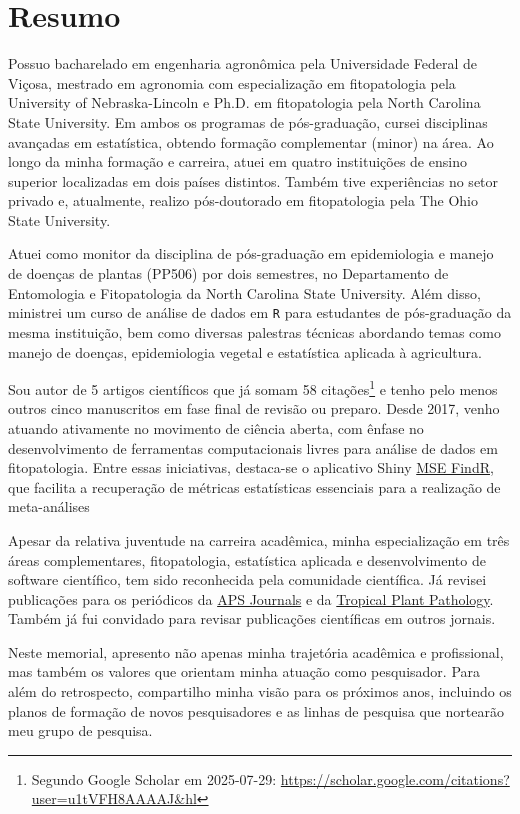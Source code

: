 \documentclass[12pt,a4paper,oneside]{book}
\newcommand{\UFV}{Universidade Federal de Viçosa}
\newcommand{\UNL}{University of Nebraska-Lincoln}
\newcommand{\NCState}{North Carolina State University}
\newcommand{\OSU}{The Ohio State University}
\newcommand{\APSJournals}{\href{https://apsjournals.apsnet.org/}{APS Journals}}
\newcommand{\TropicalPP}{\href{https://link.springer.com/journal/40858}{Tropical Plant Pathology}}
\newcommand{\MSEFindR}{\href{https://garnica.shinyapps.io/MSE_FindR/}{MSE FindR}}
\begin{document}
\chapter*{Resumo}

Possuo bacharelado em engenharia agronômica pela \UFV{}, mestrado em agronomia com especialização em 
fitopatologia pela \UNL{} e Ph.D. em fitopatologia pela \NCState{}. Em ambos os programas de pós-graduação, 
cursei disciplinas avançadas em estatística, obtendo formação complementar (minor) na área. Ao longo da
minha formação e carreira, atuei em quatro instituições de ensino superior localizadas em dois países 
distintos. Também tive experiências no setor privado e, atualmente, realizo pós-doutorado em fitopatologia 
pela \OSU{}.

Atuei como monitor da disciplina de pós-graduação em epidemiologia e manejo de doenças de plantas (PP506) por 
dois semestres, no Departamento de Entomologia e Fitopatologia da \NCState{}. Além disso, ministrei 
um curso de análise de dados em \texttt{R} para estudantes de pós-graduação da mesma instituição, bem 
como diversas palestras técnicas abordando temas como manejo de doenças, epidemiologia vegetal e 
estatística aplicada à agricultura.

Sou autor de 5 artigos científicos que já somam 58 citações\footnote{Segundo Google Scholar em 2025-07-29: \url{https://scholar.google.com/citations?user=u1tVFH8AAAAJ&hl}} e
tenho pelo menos outros cinco manuscritos em fase final de revisão ou preparo. Desde 2017, venho 
atuando ativamente no movimento de ciência aberta, com ênfase no desenvolvimento de ferramentas 
computacionais livres para análise de dados em fitopatologia. Entre essas iniciativas, 
destaca-se o aplicativo Shiny \MSEFindR{}, que facilita a recuperação de métricas estatísticas 
essenciais para a realização de meta-análises

Apesar da relativa juventude na carreira acadêmica, minha especialização em três áreas complementares, 
fitopatologia, estatística aplicada e desenvolvimento de software científico, tem sido reconhecida pela 
comunidade científica. Já revisei publicações para os periódicos da \APSJournals{} e da \TropicalPP{}. Também
já fui convidado para revisar publicações científicas em outros jornais.

Neste memorial, apresento não apenas minha trajetória acadêmica e profissional, mas também os valores que 
orientam minha atuação como pesquisador. Para além do retrospecto, compartilho minha visão para os próximos
anos, incluindo os planos de formação de novos pesquisadores e as linhas de pesquisa que nortearão meu grupo de pesquisa.
\end{document}
